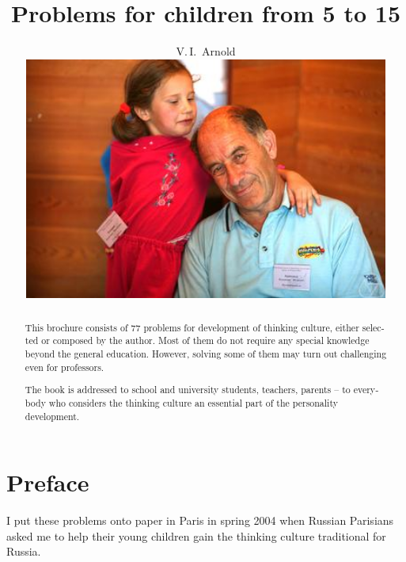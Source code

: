
\setdefaultlanguage[variant=british]{english}

\title{Problems for children from 5 to 15}

\author{V.\,I.~Arnold
\vspace*{2cm}\\ 
\includegraphics[width=12cm]{photo-arnold_small}
}
\date{}


\maketitle
\thispagestyle{empty}
\clearpage 
\setcounter{page}{1}
\begin{abstract}
This brochure consists of 77 problems for development of thinking culture, either selected or composed by the author.
Most of them do not require any special knowledge beyond the general education. However, solving some of them may
turn out challenging even for professors.

The book is addressed to school and university students, teachers, parents -- to everybody who considers the thinking culture 
an essential part of the personality development.
\end{abstract}

\clearpage 
\section*{Preface}
I put these problems onto paper in Paris in spring 2004 when Russian Parisians asked me to help
their young children gain the thinking culture traditional for Russia.

